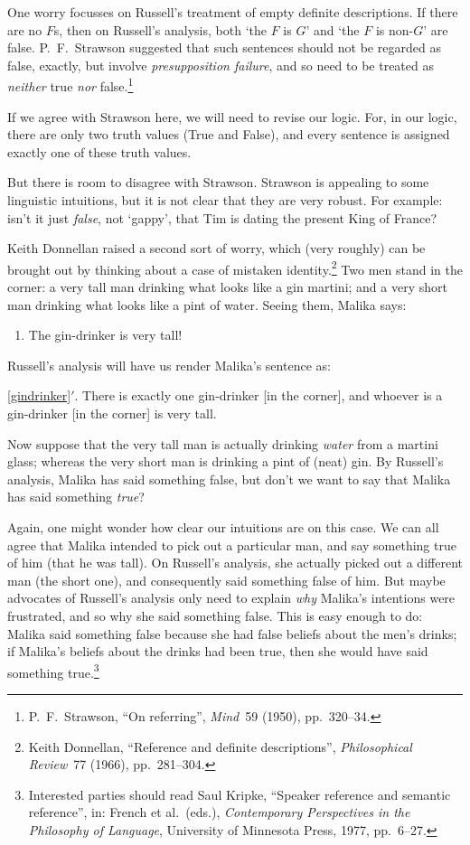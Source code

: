 One worry focusses on Russell's treatment of empty definite
descriptions. If there are no $F$s, then on Russell's analysis, both
`the $F$ is $G$' and  `the $F$ is non-$G$' are false. P.~F.\ Strawson
suggested that such sentences should not be regarded as false,
exactly, but involve \emph{presupposition failure}, and so need to be
treated as \emph{neither} true \emph{nor} false.\footnote{P.~F.\
Strawson, ``On referring'', \textit{Mind}~59 (1950), pp.\ 320--34.}

If we agree with Strawson here, we will need to revise our logic. For, in our logic, there are only two truth values (True and False), and every sentence is assigned exactly one of these truth values.

But there is room to disagree with Strawson. Strawson is appealing to some linguistic intuitions, but it is not clear that they are very robust. For example: isn't it just \emph{false}, not `gappy', that Tim is dating the present King of France?

Keith Donnellan raised a second sort of worry, which (very roughly)
can be brought out by thinking about a case of mistaken
identity.\footnote{Keith Donnellan, ``Reference and definite
descriptions'', \textit{Philosophical Review}~77 (1966), pp.\ 281--304.} Two
men stand in the corner: a very tall man drinking what looks like a
gin martini; and a very short man drinking what looks like a pint of
water. Seeing them, Malika says:
	\begin{enumerate}
		\item\label{gindrinker} The gin-drinker is very tall!
	\end{enumerate}
Russell's analysis will have us render Malika's sentence as:
	\begin{compactlist}
		\item[\ref*{gindrinker}$'$.] There is exactly one gin-drinker [in the corner], and whoever is a gin-drinker [in the corner] is very tall.
	\end{compactlist}
Now suppose that the very tall man is actually drinking \emph{water} from a martini glass; whereas the very short man is drinking a pint of (neat) gin. By Russell's analysis, Malika has said something false, but don't we want to say that Malika has said something \emph{true}? 

Again, one might wonder how clear our intuitions are on this case. We can all agree that Malika intended to pick out a particular man, and say something true of him (that he was tall). On Russell's analysis, she actually picked out a different man (the short one), and consequently said something false of him. But  maybe advocates of Russell's analysis only need to explain \emph{why} Malika's intentions were frustrated, and so why she said something false. This is easy enough to do:  Malika said something false because she had false beliefs about the men's drinks; if Malika's beliefs about the drinks had been true,  then she would have said something true.\footnote{Interested parties should read Saul Kripke, ``Speaker reference and semantic reference'', in: French et al.\ (eds.), \textit{Contemporary Perspectives in the Philosophy of Language}, University of Minnesota Press, 1977, pp.\ 6--27.}

